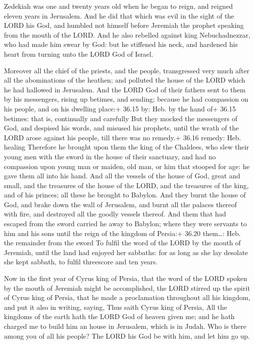  Zedekiah was one and twenty years old when he began to
reign, and reigned eleven years in Jerusalem.  And he did
that which was evil in the sight of the LORD his God, and humbled not
himself before Jeremiah the prophet speaking from the mouth of the LORD.
 And he also rebelled against king Nebuchadnezzar, who had
made him swear by God: but he stiffened his neck, and hardened his heart
from turning unto the LORD God of Israel.

 Moreover all the chief of the priests, and the people,
transgressed very much after all the abominations of the heathen; and
polluted the house of the LORD which he had hallowed in Jerusalem.
 And the LORD God of their fathers sent to them by his
messengers, rising up betimes, and sending; because he had compassion on
his people, and on his dwelling place:+ 36.15 by: Heb. by the hand of+
36.15 betimes: that is, continually and carefully  But they
mocked the messengers of God, and despised his words, and misused his
prophets, until the wrath of the LORD arose against his people, till
there was no remedy.+ 36.16 remedy: Heb. healing  Therefore
he brought upon them the king of the Chaldees, who slew their young men
with the sword in the house of their sanctuary, and had no compassion
upon young man or maiden, old man, or him that stooped for age: he gave
them all into his hand.  And all the vessels of the house
of God, great and small, and the treasures of the house of the LORD, and
the treasures of the king, and of his princes; all these he brought to
Babylon.  And they burnt the house of God, and brake down
the wall of Jerusalem, and burnt all the palaces thereof with fire, and
destroyed all the goodly vessels thereof.  And them that
had escaped from the sword carried he away to Babylon; where they were
servants to him and his sons until the reign of the kingdom of Persia:+
36.20 them\ldots: Heb. the remainder from the sword  To
fulfil the word of the LORD by the mouth of Jeremiah, until the land had
enjoyed her sabbaths: for as long as she lay desolate she kept sabbath,
to fulfil threescore and ten years.

 Now in the first year of Cyrus king of Persia, that the
word of the LORD spoken by the mouth of Jeremiah might be accomplished,
the LORD stirred up the spirit of Cyrus king of Persia, that he made a
proclamation throughout all his kingdom, and put it also in writing,
saying,  Thus saith Cyrus king of Persia, All the kingdoms
of the earth hath the LORD God of heaven given me; and he hath charged
me to build him an house in Jerusalem, which is in Judah. Who is there
among you of all his people? The LORD his God be with him, and let him
go up.

